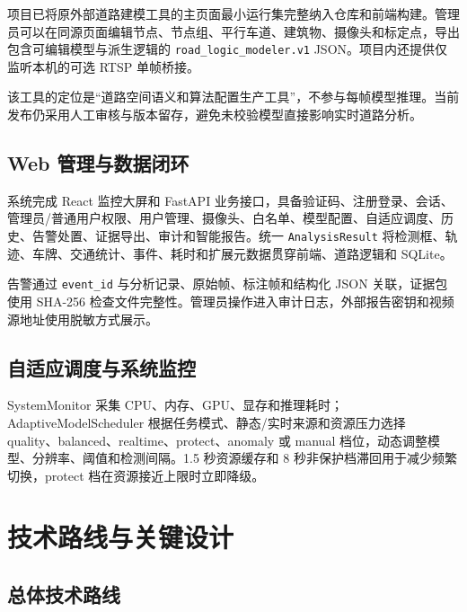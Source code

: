 项目已将原外部道路建模工具的主页面最小运行集完整纳入仓库和前端构建。管理员可以在同源页面编辑节点、节点组、平行车道、建筑物、摄像头和标定点，导出包含可编辑模型与派生逻辑的 \texttt{road\_\allowbreak{}logic\_\allowbreak{}modeler.\allowbreak{}v1} JSON。项目内还提供仅监听本机的可选 RTSP 单帧桥接。

该工具的定位是``道路空间语义和算法配置生产工具''，不参与每帧模型推理。当前发布仍采用人工审核与版本留存，避免未校验模型直接影响实时道路分析。

\subsection{Web 管理与数据闭环}\label{summary-web-ux7ba1ux7406ux4e0eux6570ux636eux95edux73af}

系统完成 React 监控大屏和 FastAPI 业务接口，具备验证码、注册登录、会话、管理员/普通用户权限、用户管理、摄像头、白名单、模型配置、自适应调度、历史、告警处置、证据导出、审计和智能报告。统一 \texttt{Analysis\allowbreak{}Result} 将检测框、轨迹、车牌、交通统计、事件、耗时和扩展元数据贯穿前端、道路逻辑和 SQLite。

告警通过 \texttt{event\_\allowbreak{}id} 与分析记录、原始帧、标注帧和结构化 JSON 关联，证据包使用 SHA-256 检查文件完整性。管理员操作进入审计日志，外部报告密钥和视频源地址使用脱敏方式展示。

\subsection{自适应调度与系统监控}\label{summary-ux81eaux9002ux5e94ux8c03ux5ea6ux4e0eux7cfbux7edfux76d1ux63a7}

SystemMonitor 采集 CPU、内存、GPU、显存和推理耗时；AdaptiveModelScheduler 根据任务模式、静态/实时来源和资源压力选择 quality、balanced、realtime、protect、anomaly 或 manual 档位，动态调整模型、分辨率、阈值和检测间隔。1.5 秒资源缓存和 8 秒非保护档滞回用于减少频繁切换，protect 档在资源接近上限时立即降级。

\section{技术路线与关键设计}\label{summary-ux6280ux672fux8defux7ebfux4e0eux5173ux952eux8bbeux8ba1}

\subsection{总体技术路线}\label{summary-ux603bux4f53ux6280ux672fux8defux7ebf}

